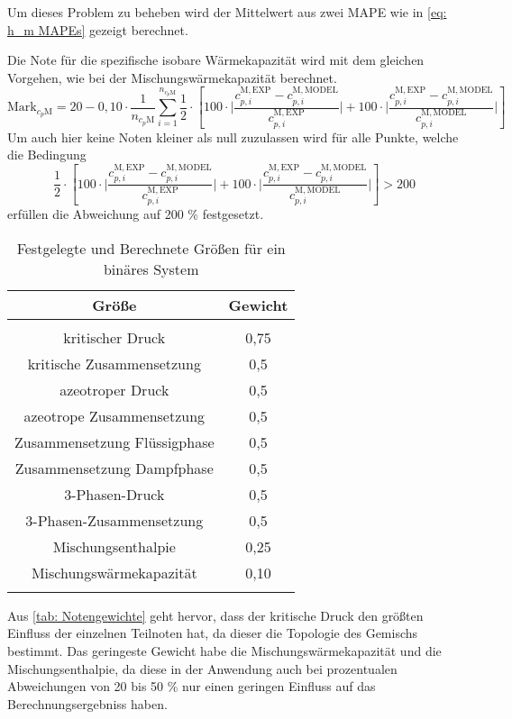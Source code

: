 \documentclass[../thesis.tex]{subfiles}
\begin{document}
Um dieses Problem zu beheben wird der Mittelwert aus zwei MAPE wie in \autoref{eq: h_m MAPEs} gezeigt berechnet.

Die Note für die spezifische isobare Wärmekapazität wird mit dem gleichen Vorgehen, wie bei der Mischungswärmekapazität berechnet.
\begin{equation}
\mathrm{Mark}_{c_p{\mathrm{M}}} = 20 - 0,10 \cdot \dfrac{1}{n_{c_p{\mathrm{M}}}} \sum_{i=1}^{n_{c_p{\mathrm{M}}}}
\dfrac{1}{2} \cdot \left[
100 \cdot \biggl|
\dfrac{c_{p,i}^{\mathrm{M,EXP}}-c_{p,i}^{\mathrm{M,MODEL}}}{c_{p,i}^{\mathrm{M,EXP}}} 
\biggl| 
+ 100 \cdot \biggl| \dfrac{c_{p,i}^{\mathrm{M,EXP}}-c_{p,i}^{\mathrm{M,MODEL}}}{c_{p,i}^{\mathrm{M,MODEL}}}
\biggl|
\right]
\end{equation}
Um auch hier keine Noten kleiner als null zuzulassen wird für alle Punkte, welche die Bedingung 
\begin{equation}
\dfrac{1}{2} \cdot \left[
100 \cdot \biggl|
\dfrac{c_{p,i}^{\mathrm{M,EXP}}-c_{p,i}^{\mathrm{M,MODEL}}}{c_{p,i}^{\mathrm{M,EXP}}} 
\biggl| 
+ 100 \cdot \biggl| \dfrac{c_{p,i}^{\mathrm{M,EXP}}-c_{p,i}^{\mathrm{M,MODEL}}}{c_{p,i}^{\mathrm{M,MODEL}}}
\biggl| \right]> 200
\end{equation}
erfüllen die Abweichung auf 200 \% festgesetzt.

\begin{table} [htb]
	\centering
	\caption{Festgelegte und Berechnete Größen für ein binäres System}
	\begin{tabular}{ cc }
		\hline 
		Größe & Gewicht \\
		\hline  \\ 
		[\dimexpr-\normalbaselineskip+2pt]
		kritischer Druck  & 0,75   \\
		kritische Zusammensetzung  & 0,5   \\
		azeotroper Druck  & 0,5  \\
		azeotrope Zusammensetzung  & 0,5  \\
		Zusammensetzung Flüssigphase & 0,5 \\
		Zusammensetzung Dampfphase & 0,5 \\
		3-Phasen-Druck & 0,5   \\
		3-Phasen-Zusammensetzung & 0,5  \\
		Mischungsenthalpie & 0,25 \\
		Mischungswärmekapazität & 0,10 \\
		[\dimexpr-\normalbaselineskip+18pt]
		\hline
		\label{tab: Notengewichte}
	\end{tabular}
\end{table}

Aus \autoref{tab: Notengewichte} geht hervor, dass der kritische Druck den größten Einfluss der einzelnen Teilnoten hat, da dieser die Topologie des Gemischs bestimmt. Das geringeste Gewicht habe die Mischungswärmekapazität und die Mischungsenthalpie, da diese in der Anwendung auch bei prozentualen Abweichungen von 20 bis 50 \% nur einen geringen Einfluss auf das Berechnungsergebniss haben.
\end{document}
